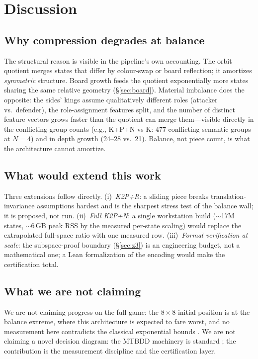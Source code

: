 \documentclass[conference]{IEEEtran}
\begin{document}
\section{Discussion}
\label{sec:discussion}

\subsection{Why compression degrades at balance}
The structural reason is visible in the pipeline's own accounting. The orbit
quotient merges states that differ by colour-swap or board reflection; it
amortizes \emph{symmetric} structure. Board growth feeds the quotient
exponentially more states sharing the same relative geometry
(\S\ref{sec:board}). Material imbalance does the opposite: the sides'
kings assume qualitatively different roles (attacker vs.\ defender), the
role-assignment features split, and the number of distinct feature vectors
grows faster than the quotient can merge them---visible directly in the
conflicting-group counts (e.g., K+P+N vs K: 477 conflicting semantic groups
at $N{=}4$) and in depth growth (24--28 vs.\ 21). Balance, not piece count,
is what the architecture cannot amortize.

\subsection{What would extend this work}
Three extensions follow directly. (i)~\emph{K2P+R}: a sliding piece breaks
translation-invariance assumptions hardest and is the sharpest stress test
of the balance wall; it is proposed, not run. (ii)~\emph{Full K2P+N}: a
single workstation build ($\sim$17M states, $\sim$6\,GB peak RSS by the
measured per-state scaling) would replace the extrapolated full-space ratio
with one measured row. (iii)~\emph{Formal verification at scale}: the
subspace-proof boundary (\S\ref{sec:z3}) is an engineering budget, not a
mathematical one; a Lean formalization of the encoding would make the
certification total.

\subsection{What we are not claiming}
We are not claiming progress on the full game: the $8\times8$ initial
position is at the balance extreme, where this architecture is expected to
fare worst, and no measurement here contradicts the classical exponential
bounds \cite{fraenkel1983}. We are not claiming a novel decision diagram:
the MTBDD machinery is standard \cite{bryant1986,bahar1997,fujita1997}; the
contribution is the measurement discipline and the certification layer.
\end{document}
